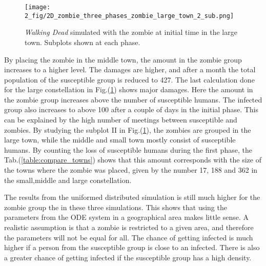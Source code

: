 \documentclass[%
twoside,                 %
final,                   %
chapterprefix=true,      %
open=right               %
10pt]{book}
\begin{document}
\begin{figure}[ht]
  \centerline{\texttt{[image: 2\_fig/2D\_zombie\_three\_phases\_zombie\_large\_town\_2\_sub.png]}}
  \caption{
  \label{fig:large_town} \emph{Walking Dead} simulated with the zombie at initial time in the large town. Subplots shown at each phase.
  }
\end{figure}


By placing the zombie in the middle town, the amount in the zombie group increases to a higher level. The damages are higher, and after a month the total population of the susceptible group is reduced to 427. The last calculation done for the large constellation in Fig.(\ref{fig:large_town}) shows major damages. Here the amount in the zombie group increases above the number of susceptible humans. The infected group also increases to above 100 after a couple of days in the initial phase. This can be explained by the high number of meetings between susceptible and zombies. By studying the subplot II in Fig.(\ref{fig:large_town}), the zombies are grouped in the large town, while the middle and small town mostly consist of susceptible humans. By counting the loss of susceptible humans during the first phase, the Tab.(\ref{table:compare_towns}) shows that this amount corresponds with the size of the towns where the zombie was placed, given by the number 17, 188 and 362 in the small,middle and large constellation. 


\vspace{3mm}




\vspace{3mm}


The results from the uniformed distributed simulation is still much higher for the zombie group the in these three simulations. This shows that using the parameters from the ODE system in a geographical area makes little sense. A realistic assumption is that a zombie is restricted to a given area, and therefore the parameters will not be equal for all. The chance of getting infected is much higher if a person from the susceptible group is close to an infected. There is also a greater chance of getting infected if the susceptible group has a high density. 


\end{document}
